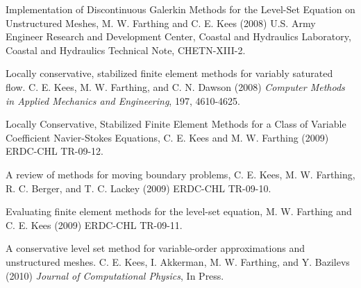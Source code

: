 \documentclass{beamer}
\begin{document}
\begin{frame}
\bit
\footnotesize
\item Implementation of Discontinuous Galerkin Methods for the
  Level-Set Equation on Unstructured Meshes, M. W. Farthing and C. E.
  Kees (2008) U.S. Army Engineer Research and Development Center,
  Coastal and Hydraulics Laboratory, Coastal and Hydraulics Technical
  Note, CHETN-XIII-2.

\item Locally conservative, stabilized finite element methods for
  variably saturated flow. C. E. Kees, M. W. Farthing, and C. N.
  Dawson (2008) {\em Computer Methods in Applied Mechanics and
    Engineering}, 197, 4610-4625.

\item Locally Conservative, Stabilized Finite Element Methods for a
  Class of Variable Coefficient Navier-Stokes Equations, C. E. Kees
  and M. W. Farthing (2009) ERDC-CHL TR-09-12.

\item A review of methods for moving boundary problems, C. E. Kees,
  M. W. Farthing, R. C. Berger, and T. C. Lackey (2009) ERDC-CHL
  TR-09-10.

\item Evaluating finite element methods for the level-set equation,
  M. W. Farthing and C. E. Kees (2009) ERDC-CHL TR-09-11.

\item A conservative level set method for variable-order
  approximations and unstructured meshes. C. E. Kees, I. Akkerman,
  M. W. Farthing, and Y. Bazilevs (2010) {\em Journal of Computational
    Physics}, In Press.
\eit
\end{frame}


  
 
\end{document}
